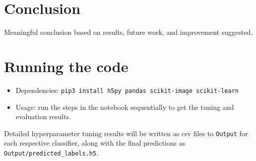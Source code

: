 \documentclass[landscape,twocolumn]{article}
\begin{document}
\section{Conclusion}
Meaningful conclusion based on results, future work, and improvement suggested.

\printbibliography\appendix
\section{Running the code}
\begin{itemize}
\item Dependencies: \texttt{pip3 install h5py pandas scikit-image scikit-learn}
\item Usage: run the steps in the notebook sequentially to get the tuning and evaluation results.
\end{itemize}
Detailed hyperparameter tuning results will be written as csv files to \texttt{Output} for each respective classifier, along with the final predictions as \texttt{Output/predicted\_labels.h5}.
\end{document}
